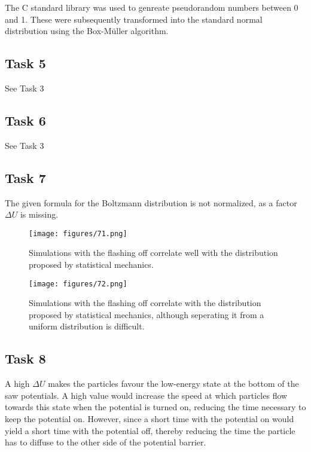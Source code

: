 The C standard library was used to genreate pseudorandom numbers between 0 and 1.
These were subsequently transformed into the standard normal distribution
using the Box-Müller algorithm.

\subsection*{Task 5}

See Task 3

\subsection*{Task 6}

See Task 3

\subsection*{Task 7}

The given formula for the Boltzmann distribution is not normalized,
as a factor $\Delta U$ is missing. 

\begin{figure}
    \centering
    \texttt{[image: figures/71.png]}
    \caption{
        Simulations with the flashing off correlate well with the distribution
        proposed by statistical mechanics.
    }
    \label{fig:71}
\end{figure}

\begin{figure}
    \centering
    \texttt{[image: figures/72.png]}
    \caption{
        Simulations with the flashing off correlate with the distribution
        proposed by statistical mechanics, although seperating it from a 
        uniform distribution is difficult.
    }
    \label{fig:72}
\end{figure}

\subsection*{Task 8}

A high $\Delta U$ makes the particles favour the low-energy state at the
bottom of the saw potentials. A high value would increase the speed at which
particles flow towards this state when the potential is turned on, 
reducing the time necessary to keep the potential on. 
However, since a short time with the potential on would yield 
a short time with the potential off, thereby reducing the time the particle 
has to diffuse to the other side of the potential barrier. 

